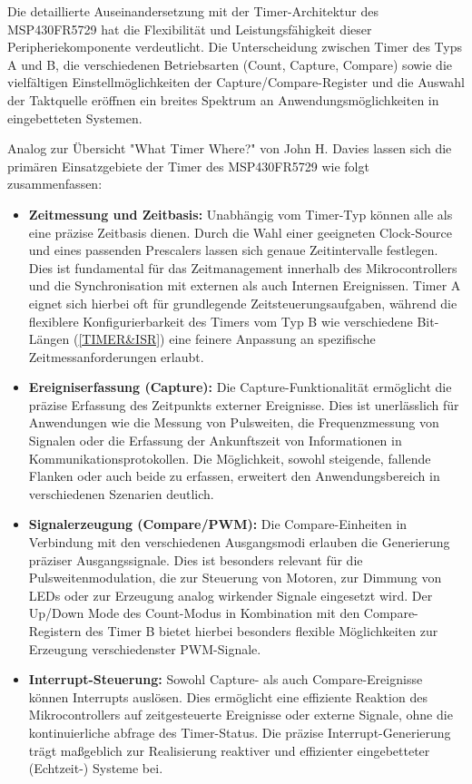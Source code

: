Die detaillierte Auseinandersetzung mit der Timer-Architektur des MSP430FR5729 hat die Flexibilit\"at und Leistungsf\"ahigkeit dieser Peripheriekomponente verdeutlicht. Die Unterscheidung zwischen Timer des Typs A und B, die verschiedenen Betriebsarten (Count, Capture, Compare) sowie die vielf\"altigen Einstellm\"oglichkeiten der Capture/Compare-Register und die Auswahl der Taktquelle eröffnen ein breites Spektrum an Anwendungsm\"oglichkeiten in eingebetteten Systemen.

Analog zur \"Ubersicht "What Timer Where?" von John H. Davies lassen sich die primären Einsatzgebiete der Timer des MSP430FR5729 wie folgt zusammenfassen:

\begin{itemize}
	\item \textbf{Zeitmessung und Zeitbasis:} Unabh\"angig vom Timer-Typ können alle als eine präzise Zeitbasis dienen. Durch die Wahl einer geeigneten Clock-Source und eines passenden Prescalers lassen sich genaue Zeitintervalle festlegen. Dies ist fundamental für das Zeitmanagement innerhalb des Mikrocontrollers und die Synchronisation mit externen als auch Internen Ereignissen. Timer A eignet sich hierbei oft für grundlegende Zeitsteuerungsaufgaben, w\"ahrend die flexiblere Konfigurierbarkeit des Timers vom Typ B wie \zB verschiedene Bit-Längen (\ref{TIMER&ISR}) eine feinere Anpassung an spezifische Zeitmessanforderungen erlaubt.

	\item \textbf{Ereigniserfassung (Capture):} Die Capture-Funktionalit\"at erm\"oglicht die pr\"azise Erfassung des Zeitpunkts externer Ereignisse. Dies ist unerl\"asslich für Anwendungen wie die Messung von Pulsweiten, die Frequenzmessung von Signalen oder die Erfassung der Ankunftszeit von Informationen in Kommunikationsprotokollen. Die M\"oglichkeit, sowohl steigende, fallende Flanken oder auch beide zu erfassen, erweitert den Anwendungsbereich in verschiedenen Szenarien deutlich.

	\item \textbf{Signalerzeugung (Compare/PWM):} Die Compare-Einheiten in Verbindung mit den verschiedenen Ausgangsmodi erlauben die Generierung pr\"aziser Ausgangssignale. Dies ist besonders relevant für die Pulsweitenmodulation, die zur Steuerung von Motoren, zur Dimmung von LEDs oder zur Erzeugung analog wirkender Signale eingesetzt wird. Der Up/Down Mode des Count-Modus in Kombination mit den Compare-Registern des Timer B bietet hierbei besonders flexible M\"oglichkeiten zur Erzeugung verschiedenster PWM-Signale.

	\item \textbf{Interrupt-Steuerung:} Sowohl Capture- als auch Compare-Ereignisse k\"onnen Interrupts ausl\"osen. Dies ermöglicht eine effiziente Reaktion des Mikrocontrollers auf zeitgesteuerte Ereignisse oder externe Signale, ohne die kontinuierliche abfrage des Timer-Status. Die pr\"azise Interrupt-Generierung tr\"agt maßgeblich zur Realisierung reaktiver und effizienter eingebetteter (Echtzeit-) Systeme bei.
\end{itemize}

